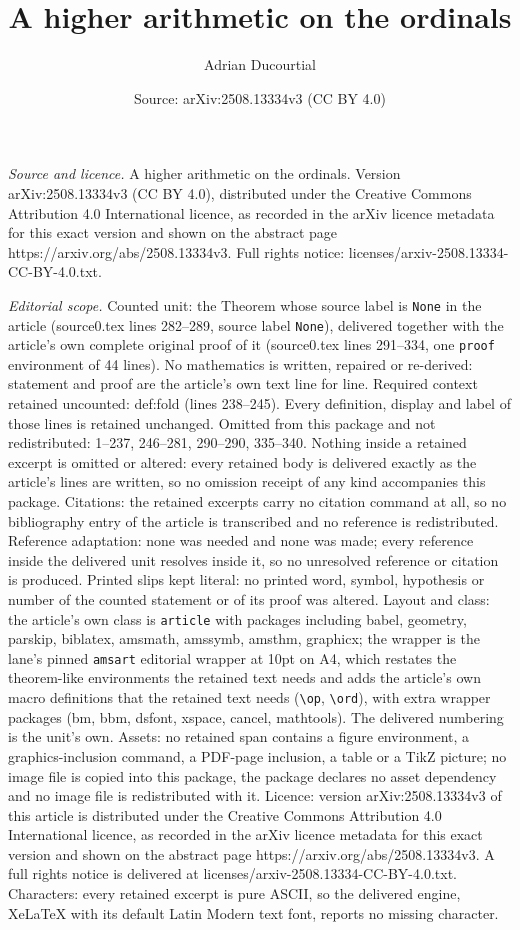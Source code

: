 \documentclass[10pt,a4paper]{amsart}
\title[A higher arithmetic on the ordinals]{A higher arithmetic on the ordinals}
\author{Adrian Ducourtial}
\date{Source: arXiv:2508.13334v3 (CC BY 4.0)}
\begin{document}
\maketitle

\noindent\emph{Source and licence.} A higher arithmetic on the ordinals. Version arXiv:2508.13334v3 (CC BY 4.0), distributed under the Creative Commons Attribution 4.0 International licence, as recorded in the arXiv licence metadata for this exact version and shown on the abstract page https://arxiv.org/abs/2508.13334v3. Full rights notice: licenses/arxiv-2508.13334-CC-BY-4.0.txt.\par\smallskip

\noindent\textit{Editorial scope.} Counted unit: the Theorem whose source label is \texttt{None} in the article (source0.tex lines 282--289, source label \texttt{None}), delivered together with the article's own complete original proof of it (source0.tex lines 291--334, one \texttt{proof} environment of 44 lines). No mathematics is written, repaired or re-derived: statement and proof are the article's own text line for line. Required context retained uncounted: def:fold (lines 238--245). Every definition, display and label of those lines is retained unchanged. Omitted from this package and not redistributed: 1--237, 246--281, 290--290, 335--340. Nothing inside a retained excerpt is omitted or altered: every retained body is delivered exactly as the article's lines are written, so no omission receipt of any kind accompanies this package. Citations: the retained excerpts carry no citation command at all, so no bibliography entry of the article is transcribed and no reference is redistributed. Reference adaptation: none was needed and none was made; every reference inside the delivered unit resolves inside it, so no unresolved reference or citation is produced. Printed slips kept literal: no printed word, symbol, hypothesis or number of the counted statement or of its proof was altered. Layout and class: the article's own class is \texttt{article} with packages including babel, geometry, parskip, biblatex, amsmath, amssymb, amsthm, graphicx; the wrapper is the lane's pinned \texttt{amsart} editorial wrapper at 10pt on A4, which restates the theorem-like environments the retained text needs and adds the article's own macro definitions that the retained text needs (\texttt{\textbackslash op}, \texttt{\textbackslash ord}), with extra wrapper packages (bm, bbm, dsfont, xspace, cancel, mathtools). The delivered numbering is the unit's own. Assets: no retained span contains a figure environment, a graphics-inclusion command, a PDF-page inclusion, a table or a TikZ picture; no image file is copied into this package, the package declares no asset dependency and no image file is redistributed with it. Licence: version arXiv:2508.13334v3 of this article is distributed under the Creative Commons Attribution 4.0 International licence, as recorded in the arXiv licence metadata for this exact version and shown on the abstract page https://arxiv.org/abs/2508.13334v3. A full rights notice is delivered at licenses/arxiv-2508.13334-CC-BY-4.0.txt. Characters: every retained excerpt is pure ASCII, so the delivered engine, XeLaTeX with its default Latin Modern text font, reports no missing character.
\end{document}
